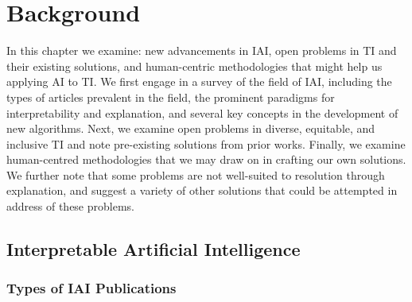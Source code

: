 



\chapter{\label{ch:background}Background} 
In this chapter we examine: new advancements in  IAI, open problems in TI and their existing solutions, and human-centric methodologies that might help us applying AI to TI. We first engage in a survey of the field of IAI, including the types of articles prevalent in the field, the prominent paradigms for interpretability and explanation, and several key concepts in the development of new algorithms. Next, we examine open problems in diverse, equitable, and inclusive TI and note pre-existing solutions from prior works. Finally, we examine human-centred methodologies that we may draw on in crafting our own solutions. We further note that some problems are not well-suited to resolution through explanation, and suggest a variety of other solutions that could be attempted in address of these problems.

\minitoc

\section{Interpretable Artificial Intelligence}
\subsection{Types of IAI Publications}

